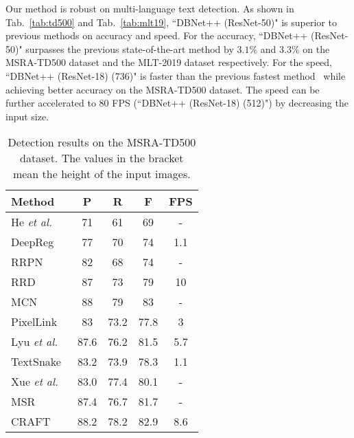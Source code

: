 Our method is robust on multi-language text detection. As shown in Tab.~\ref{tab:td500} and Tab.~\ref{tab:mlt19}, ``DBNet++ (ResNet-50)" is superior to previous methods on accuracy and speed. For the accuracy, ``DBNet++ (ResNet-50)" surpasses the previous state-of-the-art method by $3.1\%$ and $3.3\%$ on the MSRA-TD500 dataset and the MLT-2019 dataset respectively. For the speed, ``DBNet++ (ResNet-18) (736)" is faster than the previous fastest method~\cite{wang2019efficient} while achieving better accuracy on the MSRA-TD500 dataset. The speed can be further accelerated to 80 FPS (``DBNet++ (ResNet-18) (512)") by decreasing the input size.

\begin{table}[ht]
\setlength{\tabcolsep}{10.0pt}
\centering
\caption{Detection results on the MSRA-TD500 dataset. The values in the bracket mean the height of the input images.}
\begin{tabularx}{1.0\linewidth}{lc*{3}c}
\toprule
Method        & P             & R             & F             & FPS         \\ \midrule
He \textit{et al.}~\cite{he2016text}          & 71            & 61            & 69            & -         \\ 
DeepReg~\cite{deepdirect}       & 77            & 70            & 74            & 1.1         \\ 
RRPN~\cite{rrpn}          & 82            & 68            & 74            & -         \\ 
RRD~\cite{liao2018rotation}           & 87            & 73            & 79            & 10          \\ 
MCN~\cite{mcn}          & 88            & 79            & 83            & -         \\ 
PixelLink~\cite{deng2018pixellink}     & 83            & 73.2          & 77.8          & 3           \\ 
Lyu \textit{et al.}~\cite{lyu2018multi}    & 87.6          & 76.2          & 81.5          & 5.7         \\ 
TextSnake~\cite{long2018textsnake}     & 83.2          & 73.9          & 78.3          & 1.1         \\ 
Xue \textit{et al.}~\cite{xue2018accurate}         & 83.0          & 77.4          & 80.1          & -       \\ 
MSR~\cite{MSR}     & 87.4          & 76.7          & 81.7          & -       \\   
CRAFT~\cite{craft}         & 88.2          & 78.2          & 82.9          & 8.6       \\ 

\end{tabularx}
\end{table}

